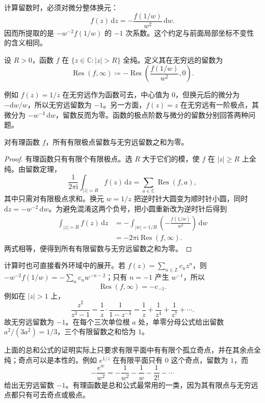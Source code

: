 \ProseParagraphBreak

计算留数时，必须对微分整体换元：
\[
 f(z)\,\mathrm{d}z=-\frac{f(1/w)}{w^2}\,\mathrm{d}w.
\]
因而所提取的是 \(-w^{-2}f(1/w)\) 的 \(-1\) 次系数。这个约定与前面局部坐标不变性的含义相同。

\begin{definition}\label{b3:def:03-infinity-residue}
设 \(R>0\)，函数 \(f\) 在 \(\{z\in\mathbb C:|z|>R\}\) 全纯。定义其在无穷远的留数为
\[
 \operatorname{Res}(f,\infty)\coloneqq-\operatorname{Res}\left(\frac{f(1/w)}{w^2},0\right).
\]
\end{definition}
例如 \(f(z)=1/z\) 在无穷远作为函数可去，中心值为 \(0\)，但换元后的微分为 \(-\mathrm{d}w/w\)，所以无穷远留数为 \(-1\)。另一方面，\(f(z)=z\) 在无穷远有一阶极点，其微分为 \(-w^{-3}\,\mathrm{d}w\)，留数反而为零。函数的极点阶数与微分的留数分别回答两种问题。

\begin{proposition}\label{b3:prop:03-global-residue}
对有理函数 \(f\)，所有有限极点留数与无穷远留数之和为零。
\end{proposition}
\begin{proof}
有理函数只有有限个有限极点。选 \(R\) 大于它们的模，使 \(f\) 在 \(|z|\ge R\) 上全纯。由留数定理，
\[
 \frac1{2\pi\mathrm{i}}\int_{|z|=R}f(z)\,\mathrm{d}z
 =\sum_{a\in\mathbb C}\operatorname{Res}(f,a),
\]
其中只需对有限极点求和。换元 \(w=1/z\) 把逆时针大圆变为顺时针小圆，同时 \(\mathrm{d}z=-w^{-2}\,\mathrm{d}w\)。为避免混淆这两个负号，把小圆重新改为逆时针后得到
\[
 \begin{aligned}
 \int_{|z|=R}f(z)\,\mathrm{d}z
 &=-\int_{|w|=1/R}\left(-\frac{f(1/w)}{w^2}\right)\,\mathrm{d}w\\
 &=-2\pi\mathrm{i}\operatorname{Res}(f,\infty).
 \end{aligned}
\]
两式相等，便得到所有有限留数与无穷远留数之和为零。
\end{proof}
计算时也可直接看外环域中的展开。若 \(f(z)=\sum_{n\in\mathbb Z}c_nz^n\)，则
\(-w^{-2}f(1/w)=-\sum_n c_nw^{-n-2}\)；只有 \(n=-1\) 产生 \(w^{-1}\)，所以
\[
 \operatorname{Res}(f,\infty)=-c_{-1}.
\]
例如在 \(|z|>1\) 上，
\[
 \frac{z^2}{z^3-1}
 =\frac1z\cdot\frac1{1-z^{-3}}
 =\frac1z+\frac1{z^4}+\frac1{z^7}+\cdots.
\]
故无穷远留数为 \(-1\)。在每个三次单位根 \(a\) 处，单零分母公式给出留数 \(a^2/(3a^2)=1/3\)，三个有限留数之和恰为 \(1\)。

\ProseParagraphBreak

上面的总和公式的证明实际上只要求有限平面中有有限个孤立奇点，并在其余点全纯；奇点可以是本性的。例如 \(e^{1/z}\) 在有限平面只有 \(0\) 这个奇点，留数为 \(1\)，而
\[
 -\frac{e^w}{w^2}=-\frac1{w^2}-\frac1w-\frac1{2!}-\cdots
\]
给出无穷远留数 \(-1\)。有理函数是总和公式最常用的一类，因为其有限点与无穷远点都只有可去奇点或极点。

